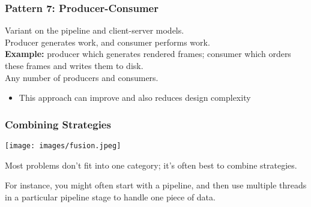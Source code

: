\begin{frame}
  \frametitle{Pattern 7: Producer-Consumer}

  
    Variant on the pipeline and client-server models.\\
    Producer generates work, and consumer performs work.\\[1em]
    {\bf Example:} producer which generates rendered frames;
      consumer which orders these frames and writes them to disk.\\[1em]
    Any number of producers and consumers.\\[1em]

    \begin{itemize}
    \item This approach can improve  and also reduces
      design complexity
    \end{itemize}
  
\end{frame}

\begin{frame}
  \frametitle{Combining Strategies}

\begin{center}
	\texttt{[image: images/fusion.jpeg]}
\end{center}
  
    Most problems don't fit into one category;  it's often best to combine
      strategies.

    For instance, you might often start with a pipeline, and then use
      multiple threads in a particular pipeline stage to handle one piece of
      data.

  

\end{frame}

